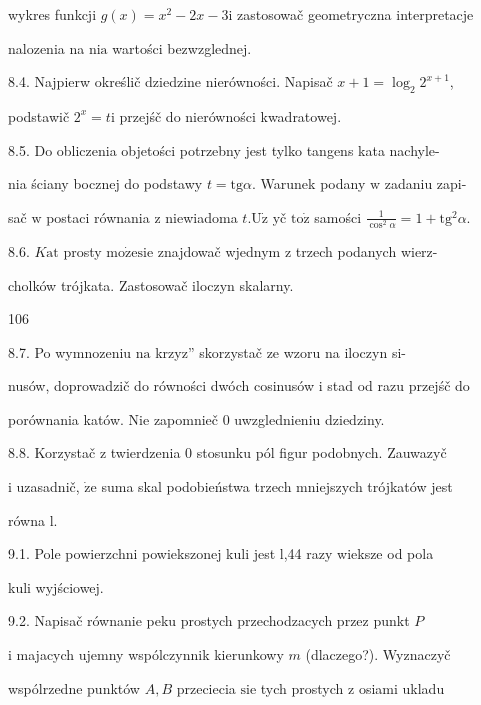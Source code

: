 \documentclass[a4paper,12pt]{article}
\begin{document}
wykres funkcji $g(x)=x^{2}-2x-3\mathrm{i}$ zastosowač geometryczna interpretacje

nalozenia na $\mathrm{n}\mathrm{i}\mathrm{a}$ wartości bezwzglednej.

8.4. Najpierw określič dziedzine nierówności. Napisač $x+1=\log_{2}2^{x+1}$,

podstawič $2^{x}=t\mathrm{i}$ przejśč do nierówności kwadratowej.

8.5. Do obliczenia objetości potrzebny jest tylko tangens kata nachyle-

nia ściany bocznej do podstawy $ t=\mathrm{t}\mathrm{g}\alpha$. Warunek podany $\mathrm{w}$ zadaniu zapi-

sač $\mathrm{w}$ postaci równania $\mathrm{z}$ niewiadoma $t. \mathrm{U}\dot{\mathrm{z}}$ yč $\mathrm{t}\mathrm{o}\dot{\mathrm{z}}$ samości $\displaystyle \frac{1}{\cos^{2}\alpha}=1+\mathrm{t}\mathrm{g}^{2}\alpha.$

8.6. $K\mathrm{a}\mathrm{t}$ prosty $\mathrm{m}\mathrm{o}\dot{\mathrm{z}}\mathrm{e}\mathrm{s}\mathrm{i}\mathrm{e}$ znajdowač wjednym $\mathrm{z}$ trzech podanych wierz-

cholków trójkata. Zastosowač iloczyn skalarny.





106

8.7. Po wymnozeniu $\mathrm{n}\mathrm{a}$ krzyz'' skorzystač ze wzoru na iloczyn si-

nusów, doprowadzič do równości dwóch cosinusów $\mathrm{i}$ stad od razu przejśč do

porównania katów. Nie zapomnieč $0$ uwzglednieniu dziedziny.

8.8. Korzystač $\mathrm{z}$ twierdzenia $0$ stosunku pól figur podobnych. Zauwazyč

$\mathrm{i}$ uzasadnič, $\dot{\mathrm{z}}\mathrm{e}$ suma skal podobieństwa trzech mniejszych trójkatów jest

równa l.

9.1. Pole powierzchni powiekszonej kuli jest l,44 razy wieksze od pola

kuli wyjściowej.

9.2. Napisač równanie peku prostych przechodzacych przez punkt $P$

$\mathrm{i}$ majacych ujemny wspólczynnik kierunkowy $m$ (dlaczego?). Wyznaczyč

wspólrzedne punktów $A, B$ przeciecia $\mathrm{s}\mathrm{i}\mathrm{e}$ tych prostych $\mathrm{z}$ osiami ukladu
\end{document}
